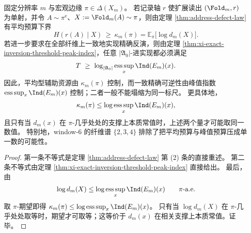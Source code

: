 \begin{corollary}[平均缺陷预算与峰值指数预算的分层]\label{cor:xi-average-defect-vs-peak-index-budget}
固定分辨率 \(m\) 与宏观边缘 \(\pi\in\Delta(X_m)\)。
若记录轴 \(r\) 使扩展读出 \((\Fold_m,r)\) 为单射，并令 \(A\sim\pi^{\mathrm e}\)、\(X:=\Fold_m(A)\sim\pi\)，则由定理 \ref{thm:address-defect-law} 有平均预算下界
\[
H(r(A)\mid X)\ \ge\ \kappa_m(\pi)
=
\mathbb E_{\pi}\bigl[\log d_m(X)\bigr].
\]
若进一步要求在全部纤维上一致地实现精确反演，则由定理 \ref{thm:xi-exact-inversion-threshold-peak-index}，任意 \(|\mathfrak A_0|\)-进实现都必须满足
\[
T\ \ge\
\log_{|\mathfrak A_0|}
\operatorname*{ess\,sup}_{x}\Ind(E_m)(x).
\]
因此，平均型辅助资源由 \(\kappa_m(\pi)\) 控制，而一致精确可逆性由峰值指数
\(
\operatorname*{ess\,sup}_{x}\Ind(E_m)(x)
\)
控制；二者一般不能塌缩为同一标尺。
更具体地，
\[
\kappa_m(\pi)
\le
\log \operatorname*{ess\,sup}_{x}\Ind(E_m)(x),
\]
且只有当 \(d_m(x)\) 在 \(\pi\)-几乎处处的支撑上本质常值时，上述两个量才可能取同一数值。
特别地，window-\(6\) 的纤维谱 \(\{2,3,4\}\) 排除了把平均预算与峰值预算压成单一数的可能性。
\end{corollary}
\begin{proof}
第一条不等式是定理 \ref{thm:address-defect-law} 第 (2) 条的直接重述。
第二条不等式由定理 \ref{thm:xi-exact-inversion-threshold-peak-index} 直接给出。
最后，由
\[
\log d_m(X)\le \log \operatorname*{ess\,sup}_{x}\Ind(E_m)(x)
\qquad\text{\(\pi\)-a.e.}
\]
取 \(\pi\)-期望即得
\(
\kappa_m(\pi)\le \log \operatorname*{ess\,sup}_{x}\Ind(E_m)(x)
\)。
只有当 \(\log d_m(X)\) 在 \(\pi\)-几乎处处取等时，期望才可取等；这等价于 \(d_m(x)\) 在相关支撑上本质常值。证毕。
\end{proof}

\endinput
